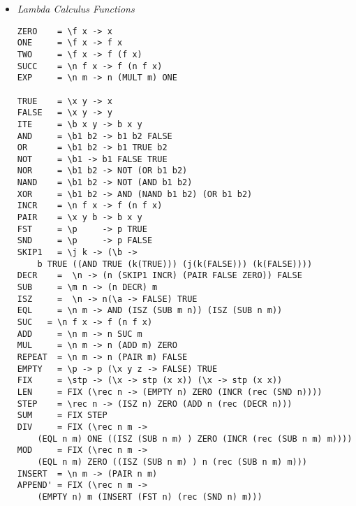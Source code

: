 \documentclass[landscape,8pt]{extarticle}
\begin{document}
\begin{multicols}{3}
\begin{itemize}
\begin{lstlisting}
toList :: Tree -> [Int]
toList Empty        = []
toList (Node x l r) = toList l ++ [x] ++ toList r
\end{lstlisting}
              \begin{lstlisting}
size :: Tree -> Int
size t = loop 0 [] t
  where
    loop :: Int -> [Tree] -> Tree -> Int
    loop acc []     Empty           = acc
    loop acc (t:ts) Empty           = loop acc ts t
    loop acc ts     (Node _ l r)    = loop (acc + 1) (r:ts) l
\end{lstlisting}
        \item \emph{Lambda Calculus Functions}
              \begin{lstlisting}
ZERO    = \f x -> x
ONE     = \f x -> f x
TWO     = \f x -> f (f x)
SUCC    = \n f x -> f (n f x)
EXP     = \n m -> n (MULT m) ONE

TRUE    = \x y -> x
FALSE   = \x y -> y
ITE     = \b x y -> b x y
AND     = \b1 b2 -> b1 b2 FALSE
OR      = \b1 b2 -> b1 TRUE b2
NOT     = \b1 -> b1 FALSE TRUE
NOR     = \b1 b2 -> NOT (OR b1 b2)
NAND    = \b1 b2 -> NOT (AND b1 b2)
XOR     = \b1 b2 -> AND (NAND b1 b2) (OR b1 b2)
INCR    = \n f x -> f (n f x)
PAIR    = \x y b -> b x y
FST     = \p     -> p TRUE
SND     = \p     -> p FALSE
SKIP1   = \j k -> (\b ->
    b TRUE ((AND TRUE (k(TRUE))) (j(k(FALSE))) (k(FALSE))))
DECR    =  \n -> (n (SKIP1 INCR) (PAIR FALSE ZERO)) FALSE
SUB     = \m n -> (n DECR) m
ISZ     =  \n -> n(\a -> FALSE) TRUE
EQL     = \n m -> AND (ISZ (SUB m n)) (ISZ (SUB n m))
SUC   = \n f x -> f (n f x)
ADD     = \n m -> n SUC m
MUL     = \n m -> n (ADD m) ZERO
REPEAT  = \n m -> n (PAIR m) FALSE
EMPTY   = \p -> p (\x y z -> FALSE) TRUE
FIX     = \stp -> (\x -> stp (x x)) (\x -> stp (x x))
LEN     = FIX (\rec n -> (EMPTY n) ZERO (INCR (rec (SND n))))
STEP    = \rec n -> (ISZ n) ZERO (ADD n (rec (DECR n)))
SUM     = FIX STEP
DIV     = FIX (\rec n m ->
    (EQL n m) ONE ((ISZ (SUB n m) ) ZERO (INCR (rec (SUB n m) m))))
MOD     = FIX (\rec n m ->
    (EQL n m) ZERO ((ISZ (SUB n m) ) n (rec (SUB n m) m)))
INSERT  = \n m -> (PAIR n m)
APPEND' = FIX (\rec n m ->
    (EMPTY n) m (INSERT (FST n) (rec (SND n) m)))


\end{lstlisting}
\end{itemize}
\end{multicols}
\end{document}
